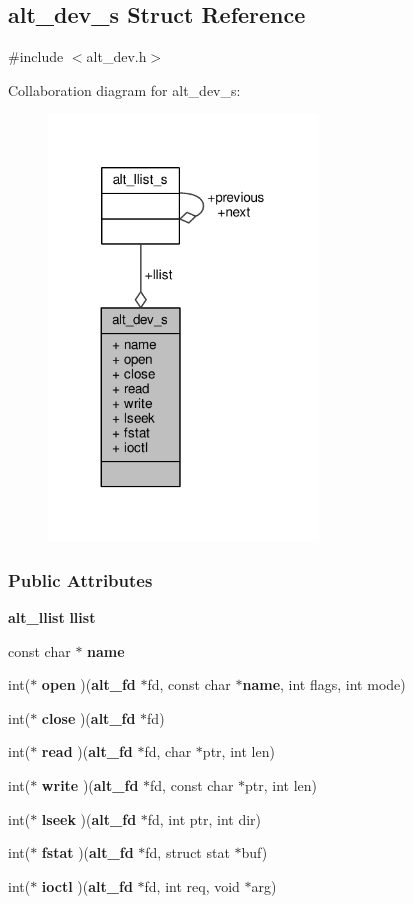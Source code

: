 \subsection{alt\+\_\+dev\+\_\+s Struct Reference}
\label{structalt__dev__s}


{\ttfamily \#include $<$alt\+\_\+dev.\+h$>$}



Collaboration diagram for alt\+\_\+dev\+\_\+s\+:
\nopagebreak
\begin{figure}[H]
\begin{center}
\leavevmode
\includegraphics[width=203pt]{de/d6c/structalt__dev__s__coll__graph}
\end{center}
\end{figure}
\subsubsection*{Public Attributes}
\begin{DoxyCompactItemize}
\item 
{\bf alt\+\_\+llist} {\bf llist}
\item 
const char $\ast$ {\bf name}
\item 
int($\ast$ {\bf open} )({\bf alt\+\_\+fd} $\ast$fd, const char $\ast${\bf name}, int flags, int mode)
\item 
int($\ast$ {\bf close} )({\bf alt\+\_\+fd} $\ast$fd)
\item 
int($\ast$ {\bf read} )({\bf alt\+\_\+fd} $\ast$fd, char $\ast$ptr, int len)
\item 
int($\ast$ {\bf write} )({\bf alt\+\_\+fd} $\ast$fd, const char $\ast$ptr, int len)
\item 
int($\ast$ {\bf lseek} )({\bf alt\+\_\+fd} $\ast$fd, int ptr, int dir)
\item 
int($\ast$ {\bf fstat} )({\bf alt\+\_\+fd} $\ast$fd, struct stat $\ast$buf)
\item 
int($\ast$ {\bf ioctl} )({\bf alt\+\_\+fd} $\ast$fd, int req, void $\ast$arg)
\end{DoxyCompactItemize}


